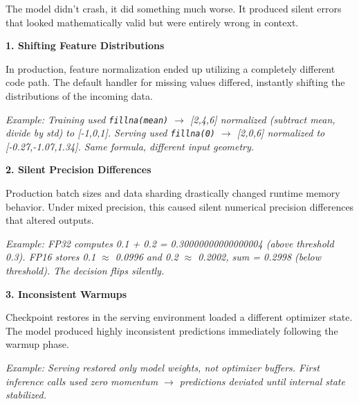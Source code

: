 \documentclass[11pt]{article}
\begin{document}
\vspace{0.15in}

The model didn't crash, it did something much worse. It produced silent errors that looked mathematically valid but were entirely wrong in context.

\vspace{0.15in}

\begin{infobox}[top=10pt, bottom=10pt, left=15pt, right=15pt]
{\large\color{brandblue}\textbf{1. Shifting Feature Distributions}}

\vspace{0.05in}
In production, feature normalization ended up utilizing a completely different code path. The default handler for missing values differed, instantly shifting the distributions of the incoming data.

\vspace{0.05in}
{\small\color{brandgray}\textit{Example: Training used \texttt{fillna(mean)} $\rightarrow$ [2,4,6] normalized (subtract mean, divide by std) to [-1,0,1]. Serving used \texttt{fillna(0)} $\rightarrow$ [2,0,6] normalized to [-0.27,-1.07,1.34]. Same formula, different input geometry.}}
\end{infobox}

\vspace{0.1in}

\begin{infobox}[top=10pt, bottom=10pt, left=15pt, right=15pt]
{\large\color{brandblue}\textbf{2. Silent Precision Differences}}

\vspace{0.05in}
Production batch sizes and data sharding drastically changed runtime memory behavior. Under mixed precision, this caused silent numerical precision differences that altered outputs.

\vspace{0.05in}
{\small\color{brandgray}\textit{Example: FP32 computes 0.1 + 0.2 = 0.30000000000000004 (above threshold 0.3). FP16 stores 0.1 $\approx$ 0.0996 and 0.2 $\approx$ 0.2002, sum = 0.2998 (below threshold). The decision flips silently.}}
\end{infobox}

\vspace{0.1in}

\begin{infobox}[top=10pt, bottom=10pt, left=15pt, right=15pt]
{\large\color{brandblue}\textbf{3. Inconsistent Warmups}}

\vspace{0.05in}
Checkpoint restores in the serving environment loaded a different optimizer state. The model produced highly inconsistent predictions immediately following the warmup phase.

\vspace{0.05in}
{\small\color{brandgray}\textit{Example: Serving restored only model weights, not optimizer buffers. First inference calls used zero momentum $\rightarrow$ predictions deviated until internal state stabilized.}}
\end{infobox}
\end{document}

